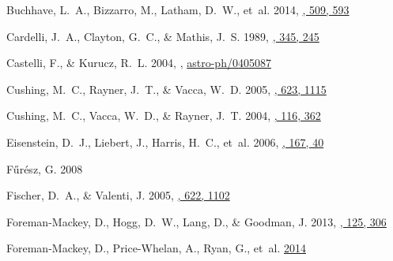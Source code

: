 \documentclass[iop,floatfix,numberedappendix,twocolappendix]{emulateapj}
\begin{document}
\begin{thebibliography}{48}
{Buchhave}, L.~A., {Bizzarro}, M., {Latham}, D.~W., {et~al.} 2014,
  \href{http://dx.doi.org/10.1038/nature13254}{\JournalTitle{\nat}, 509, 593}

{Cardelli}, J.~A., {Clayton}, G.~C., \& {Mathis}, J.~S. 1989,
  \href{http://dx.doi.org/10.1086/167900}{\JournalTitle{\apj}, 345, 245}

{Castelli}, F., \& {Kurucz}, R.~L. 2004, , \href{http://arxiv.org/abs/astro-ph/0405087}{{\sffamily
  astro-ph/0405087}}

{Cushing}, M.~C., {Rayner}, J.~T., \& {Vacca}, W.~D. 2005,
  \href{http://dx.doi.org/10.1086/428040}{\JournalTitle{\apj}, 623, 1115}

{Cushing}, M.~C., {Vacca}, W.~D., \& {Rayner}, J.~T. 2004,
  \href{http://dx.doi.org/10.1086/382907}{\JournalTitle{\pasp}, 116, 362}

{Eisenstein}, D.~J., {Liebert}, J., {Harris}, H.~C., {et~al.} 2006,
  \href{http://dx.doi.org/10.1086/507110}{\JournalTitle{\apjs}, 167, 40}

{F{\H{u}}r\'{e}sz}, G. 2008

{Fischer}, D.~A., \& {Valenti}, J. 2005,
  \href{http://dx.doi.org/10.1086/428383}{\JournalTitle{\apj}, 622, 1102}

{Foreman-Mackey}, D., {Hogg}, D.~W., {Lang}, D., \& {Goodman}, J. 2013,
  \href{http://dx.doi.org/10.1086/670067}{\JournalTitle{\pasp}, 125, 306}

Foreman-Mackey, D., Price-Whelan, A., Ryan, G., {et~al.}
  \href{http://dx.doi.org/10.5281/zenodo.10598}{2014}


\end{thebibliography}
\end{document}
